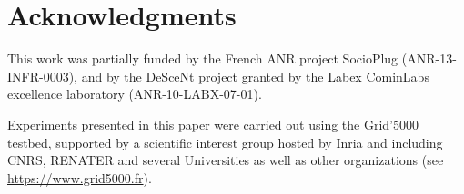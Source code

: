 
\section*{Acknowledgments}

This work was partially funded by the French ANR project SocioPlug
(ANR-13-INFR-0003), and by the DeSceNt project granted by the Labex CominLabs
excellence laboratory (ANR-10-LABX-07-01).

Experiments presented in this paper were carried out using the Grid'5000
testbed, supported by a scientific interest group hosted by Inria and including
CNRS, RENATER and several Universities as well as other organizations (see
\url{https://www.grid5000.fr}).

